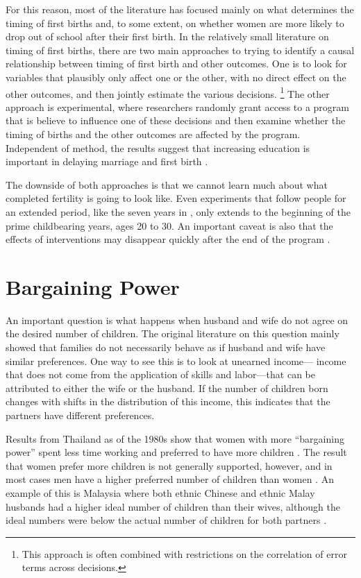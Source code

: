\documentclass[letterpaper,12pt]{article}
\begin{document}
For this reason, most of the literature has focused mainly on what
determines the timing of first births and, to some extent, on whether
women are more likely to drop out of school after their first birth. 
In the relatively small literature on timing of first births, there are
two main approaches to trying to identify a causal relationship between
timing of first birth and other outcomes. 
One is to look for variables that plausibly only affect one or the
other, with no direct effect on the other outcomes, and then jointly
estimate the various decisions.%
\footnote{
This approach is often combined with restrictions on the correlation of
error terms across decisions.} 
The other approach is experimental, where researchers randomly grant
access to a program that is believe to influence one of these decisions
and then examine whether the timing of births and the other outcomes are
affected by the program. 
Independent of method, the results suggest that increasing education is
important in delaying marriage and first birth
\citep{Duflo2015,Marchetta2016}.

The downside of both approaches is that we cannot learn much about what
completed fertility is going to look like. 
Even experiments that follow people for an extended period, like the
seven years in \citet{Duflo2015}, only extends to the beginning of the
prime childbearing years, ages 20 to 30. 
An important caveat is also that the effects of interventions may
disappear quickly after the end of the program \citep{Baird2016}.

\section{Bargaining Power}\label{bargaining-power}

An important question is what happens when husband and wife do not agree
on the desired number of children. 
The original literature on this question mainly showed that families do
not necessarily behave as if husband and wife have similar preferences. 
One way to see this is to look at unearned income--- income that does
not come from the application of skills and labor---that can be
attributed to either the wife or the husband. 
If the number of children born changes with shifts in the distribution
of this income, this indicates that the partners have different
preferences.

Results from Thailand as of the 1980s show that women with more
``bargaining power'' spent less time working and preferred to have more
children \citep{Schultz1990}. 
The result that women prefer more children is not generally supported,
however, and in most cases men have a higher preferred number of
children than women \citep{Westoff2010}. 
An example of this is Malaysia where both ethnic Chinese and ethnic
Malay husbands had a higher ideal number of children than their wives,
although the ideal numbers were below the actual number of children for
both partners \citep{Rasul2008}.
\end{document}

